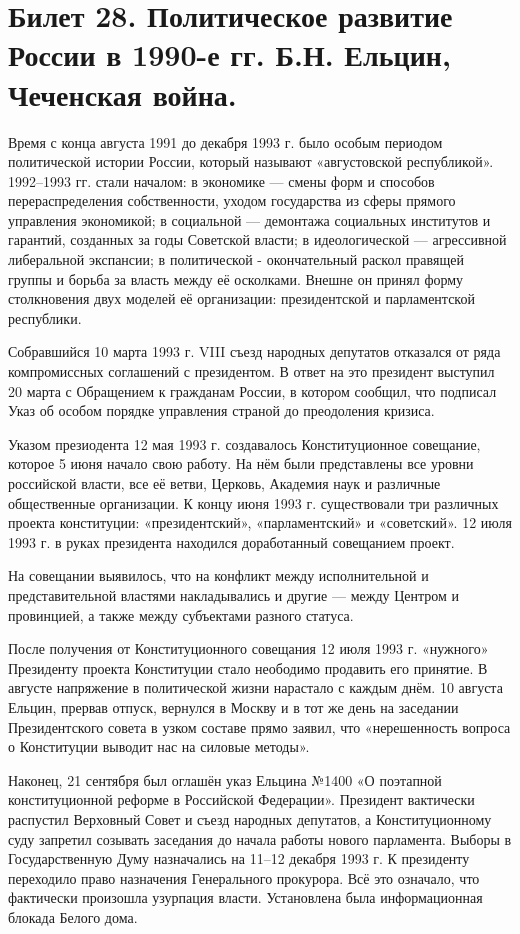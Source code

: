 \section{Билет 28. Политическое развитие России в 1990-е гг. Б.Н. Ельцин, Чеченская война.}
Время с конца августа 1991 до декабря 1993 г. было особым периодом политической истории России, который называют «августовской республикой». 1992–1993 гг. стали началом: в экономике — смены форм и способов перераспределения собственности, уходом государства из сферы прямого управления экономикой; в социальной — демонтажа социальных институтов и гарантий, созданных за годы Советской власти; в идеологической — агрессивной либеральной экспансии; в политической - окончательный раскол правящей группы и борьба за власть между её осколками. Внешне он принял форму столкновения двух моделей её организации: президентской и парламентской республики.

Собравшийся 10 марта 1993 г. VIII съезд народных депутатов отказался от ряда компромиссных соглашений с президентом. В ответ на это президент выступил 20 марта с Обращением к гражданам России, в котором сообщил, что подписал Указ об особом порядке управления страной до преодоления кризиса.

Указом презиодента 12 мая 1993 г. создавалось Конституционное совещание, которое 5 июня начало свою работу. На нём были представлены все уровни российской власти, все её ветви, Церковь, Академия наук и различные общественные организации. К концу июня 1993 г. существовали три различных проекта конституции: «президентский», «парламентский» и «советский». 12 июля 1993 г. в руках президента находился доработанный совещанием проект.

На совещании выявилось, что на конфликт между исполнительной и представительной властями накладывались и другие — между Центром и провинцией, а также между субъектами разного статуса.

После получения от Конституционного совещания 12 июля 1993 г. «нужного» Президенту проекта Конституции стало неободимо продавить его принятие. В августе напряжение в политической жизни нарастало с каждым днём. 10 августа Ельцин, прервав отпуск, вернулся в Москву и в тот же день на заседании Президентского совета в узком составе прямо заявил, что «нерешенность вопроса о Конституции выводит нас на силовые методы».

Наконец, 21 сентября был оглашён указ Ельцина №1400 «О поэтапной конституционной реформе в Российской Федерации». Президент вактически распустил Верховный Совет и съезд народных депутатов, а Конституционному суду запретил созывать заседания до начала работы нового парламента. Выборы в Государственную Думу назначались на 11–12 декабря 1993 г. К президенту переходило право назначения Генерального прокурора. Всё это означало, что фактически произошла узурпация власти. Установлена была информационная блокада Белого дома.

